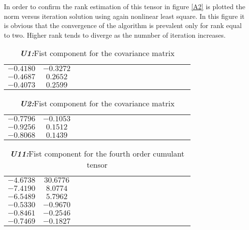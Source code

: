 In order to confirm the rank estimation of this tensor in figure \ref{A2} is plotted the norm versus iteration solution using again nonlinear least square. In this figure it is obvious that the convergence of the algorithm is prevalent only for rank equal to two. Higher rank tends to diverge as the numnber of iteration increases.











\newpage


\begin{table}[!htbp]
\centering
\caption{\textbf{\textit{U1:}}Fist component for the covariance matrix}\label{a5}
\begin{tabular}{c c c c c c c c c c c c c c c c c} 
  \hline  
   $-0.4180$&$-0.3272$\\
   $-0.4687$&$0.2652$\\
   $-0.4073$&$0.2599$\\
 \hline
\end{tabular}
\end{table}

  \begin{table}[!htbp]
\centering
\caption{\textbf{\textit{U2:}}Fist component for the covariance matrix}\label{a6}
\begin{tabular}{c c c c c c c c c c c c c c c c c} 
  \hline  

   $-0.7796$&$-0.1053$\\
   $-0.9256$&$ 0.1512$\\
   $-0.8068$&$ 0.1439$\\
 \hline
\end{tabular}
\end{table}


  \begin{table}[!htbp]
\centering
\caption{\textbf{\textit{U11:}}Fist component for the fourth order cumulant tensor}\label{a7}
\begin{tabular}{c c c c c c c c c c c c c c c c c} 
  \hline  
  \hline  
   $-4.6738$&$30.6776$\\
   $-7.4190$&$ 8.0774$\\
   $-6.5489$&$ 5.7962$\\
 \hline
 \hline  
   $-0.5330$&$-0.9670$\\
   $-0.8461$&$-0.2546$\\
   $-0.7469$&$-0.1827$\\
 \hline
 \hline
\end{tabular}
\end{table}

